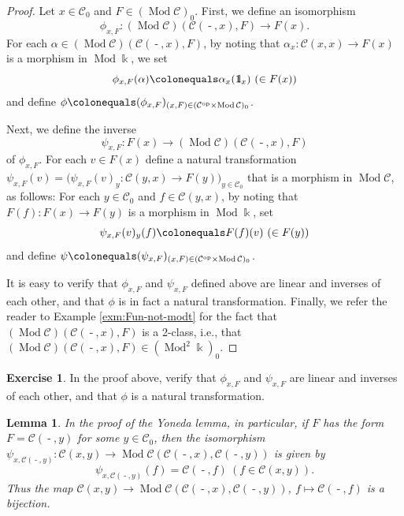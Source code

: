 \documentclass{surv-l}
\numberwithin{equation}{chapter}
\numberwithin{figure}{chapter}
\theoremstyle{plain}
\newtheorem{lem}[thm]{Lemma}
\theoremstyle{definition}
\newtheorem{exc}[thm]{Exercise}
\theoremstyle{remark}
\newcommand{\id}{1\kern-.25em{\text{{\rm l}}}}
\DeclareMathOperator{\Mod}{Mod}
\DeclareMathOperator{\blank}{-}
\begin{document}
\begin{proof}
Let $x \in {\mathcal{C}}_0$ and $F \in (\Mod{\mathcal{C}})_0$.
First, we define an isomorphism
\[
\phi_{x,F} \colon (\Mod{\mathcal{C}})({\mathcal{C}}(\blank, x), F) \to F(x).
\]
For each $\alpha \in (\Mod{\mathcal{C}})({\mathcal{C}}(\blank, x), F)$,
by noting that
$\alpha_x \colon {\mathcal{C}}(x,x) \to F(x)$ is a morphism in $\Mod\Bbbk$, we set
\[
\phi_{x,F}(\alpha)\colonequals  \alpha_x(\id_{x}) \ (\in F(x))
\]
and define $\phi\colonequals  (\phi_{x,F})_{(x,F)\in ({\mathcal{C}}^{\mathrm{op}} \times \Mod{\mathcal{C}})_0}$.

Next, we define the inverse
\[
\psi_{x,F} \colon F(x) \to (\Mod{\mathcal{C}})({\mathcal{C}}(\blank, x), F)
\]
of $\phi_{x,F}$.
For each $v \in F(x)$ define a natural transformation
$\psi_{x,F}(v) = (\psi_{x,F}(v)_y \colon$\linebreak[2] ${\mathcal{C}}(y, x) \to F(y))_{y \in {\mathcal{C}}_0}$
that is a morphism in $\Mod{\mathcal{C}}$,
as follows:
For each $y \in {\mathcal{C}}_0$ and $f \in {\mathcal{C}}(y,x)$,
by noting that
$F(f) \colon F(x) \to F(y)$ is a morphism in $\Mod\Bbbk$,
set
\[
\psi_{x,F}(v)_y(f)\colonequals   F(f)(v) \ (\in F(y))
\]
and define $\psi\colonequals  (\psi_{x,F})_{(x,F)\in ({\mathcal{C}}^{\mathrm{op}} \times \Mod{\mathcal{C}})_0}$.

It is easy to verify that
$\phi_{x,F}$ and $\psi_{x,F}$ defined above are linear and inverses of each other, and
that
$\phi$ is in fact a natural transformation.
Finally, we refer the reader to Example \ref{exm:Fun-not-modt}
for the fact that $(\Mod{\mathcal{C}})({\mathcal{C}}(\blank, x), F)$ is a 2-class,
i.e., that $(\Mod{\mathcal{C}})({\mathcal{C}}(\blank, x), F) \in (\Mod^2 \Bbbk)_0$.
\end{proof}

\begin{exc}
In the proof above, verify that $\phi_{x,F}$ and $\psi_{x,F}$ are linear and
inverses of each other, and that
$\phi$ is a natural transformation.
\end{exc}

\begin{lem}\label{lem:Yoneda-representable}
In the proof of the Yoneda lemma,
in particular, if $F$ has the form
$F = {\mathcal{C}}(\blank, y)$ for some $y \in {\mathcal{C}}_0$, then
the isomorphism $\psi_{x, {\mathcal{C}}(\blank, y)} \colon {\mathcal{C}}(x, y) \to \Mod {\mathcal{C}}({\mathcal{C}}(\blank, x), {\mathcal{C}}(\blank, y))$
is given by
\[
\psi_{x, {\mathcal{C}}(\blank, y)}(f) = {\mathcal{C}}(\blank, f)\ (f \in {\mathcal{C}}(x,y)).
\]
Thus the map
${\mathcal{C}}(x,y) \to \Mod {\mathcal{C}}({\mathcal{C}}(\blank,x), {\mathcal{C}}(\blank, y))$,
$f \mapsto {\mathcal{C}}(\blank, f)$ is a bijection.
\end{lem}
\end{document}
